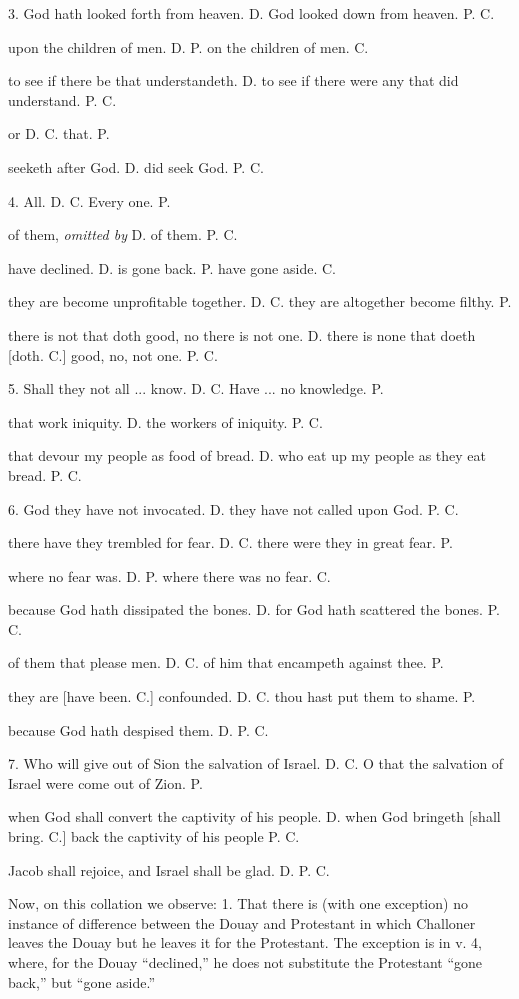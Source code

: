 3. God hath looked forth from heaven. D. God looked down from
heaven. P. C.

upon the children of men. D. P. on the children of men. C.

to see if there be that understandeth. D. to see if there were any
that did understand. P. C.

or D. C. that. P.

seeketh after God. D. did seek God. P. C.

4. All. D. C. Every one. P.

of them, \emph{omitted by} D. of them. P. C.

have declined. D. is gone back. P. have gone aside. C.

they are become unprofitable together. D. C. they are altogether
become filthy. P.

there is not that doth good, no there is not one. D. there is none
that doeth [doth. C.] good, no, not one. P. C.

5. Shall they not all ... know. D. C. Have ... no knowledge. P.

that work iniquity. D. the workers of iniquity. P. C.

that devour my people as food of bread. D. who eat up my people as
they eat bread. P. C.

6. God they have not invocated. D. they have not called upon God.
P. C.

there have they trembled for fear. D. C. there were they in great
fear. P.

where no fear was. D. P. where there was no fear. C.

because God hath dissipated the bones. D. for God hath scattered
the bones. P. C.

of them that please men. D. C. of him that encampeth against thee.
P.

they are [have been. C.] confounded. D. C. thou hast put them to
shame. P.

because God hath despised them. D. P. C.

7. Who will give out of Sion the salvation of Israel. D. C. O that
the salvation of Israel were come out of Zion. P.

when God shall convert the captivity of his people. D. when God
bringeth [shall bring. C.] back the captivity of his people P. C.

Jacob shall rejoice, and Israel shall be glad. D. P. C.

Now, on this collation we observe: 1. That there is (with one
exception) no instance of difference between the Douay and Protestant
in which Challoner leaves the Douay but he leaves it for the
Protestant. The exception is in v. 4, where, for the Douay
``declined,'' he does not substitute the Protestant ``gone
back,'' but ``gone aside.''

